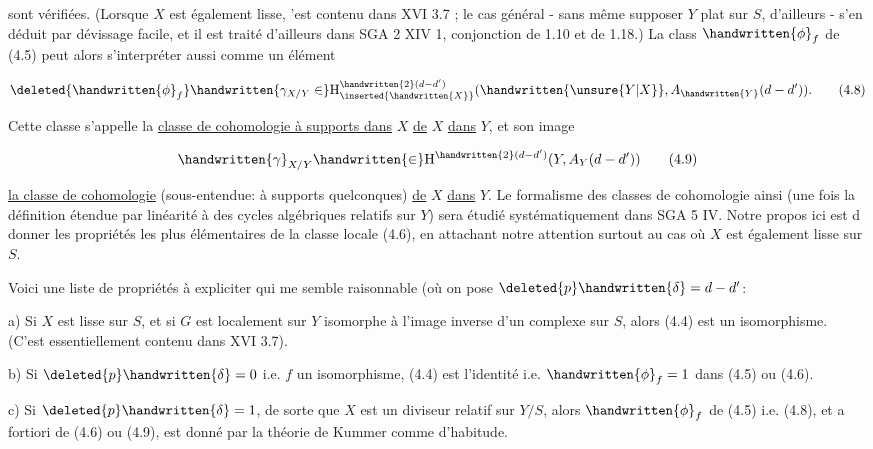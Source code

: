
sont vérifiées. (Lorsque $X$ est également lisse, 'est contenu dans XVI 3.7 ; le cas général - sans même supposer $Y$ plat sur $S$, d'ailleurs - s'en déduit par  dévissage facile, et il est traité d'ailleurs dans SGA 2 XIV 1, conjonction de 1.10 et de 1.18.) La class $\handwritten{\phi}_f$ de (4.5) peut alors s'interpréter aussi comme un élément 

\[
\deleted{\handwritten{\phi}_f}\handwritten{\gamma_{X/Y}\in}\mathrm{H}^{\handwritten{2}(d-d')}_{\inserted{\handwritten{X}}}(\handwritten{\unsure{Y|X}},A_{\handwritten{Y}}(d-d')).
\tag*{(4.8)}
\]

Cette classe s'appelle la \uline{classe de cohomologie à supports dans} $X$ \uline{de} $X$ \uline{dans} $Y$, et son image

\[
\handwritten{\gamma}_{X/Y}\handwritten{\in}\mathrm{H}^{\handwritten{2}(d-d')}(Y,A_Y(d-d'))
\tag*{(4.9)}
\]

\uline{la classe de cohomologie} (sous-entendue: à supports quelconques) \uline{de} $X$ \uline{dans} $Y$. Le formalisme des classes de cohomologie ainsi   (une fois la définition étendue par linéarité à des cycles algébriques relatifs sur $Y$) sera étudié systématiquement dans SGA 5 IV. Notre propos ici est d donner  les propriétés les plus élémentaires de la classe locale (4.6), en attachant notre attention surtout au cas où $X$ est également lisse sur $S$.

Voici une liste de propriétés à expliciter qui me semble raisonnable\deleted{\unsure{;|:}} (où on pose $\deleted{p}\handwritten{\delta}=d-d'$\deleted{;}\handwritten{)}:

a) Si $X$ est lisse sur $S$, et si $G$ est localement sur $Y$ isomorphe à l'image inverse d'un complexe sur $S$, alors (4.4) est un isomorphisme. (C'est essentiellement contenu dans XVI 3.7).

b) Si $\deleted{p}\handwritten{\delta}=0$ i.e. $f$ un isomorphisme, (4.4) est l'identité i.e. $\handwritten{\phi}_f=1$ dans (4.5) ou (4.6).

c) Si $\deleted{p}\handwritten{\delta}=1$, de sorte que $X$ est un diviseur relatif sur $Y/S$, alors $\handwritten{\phi}_f$ de (4.5) i.e. (4.8), et a fortiori de (4.6) ou (4.9), est donné par la théorie de Kummer comme d'habitude.

